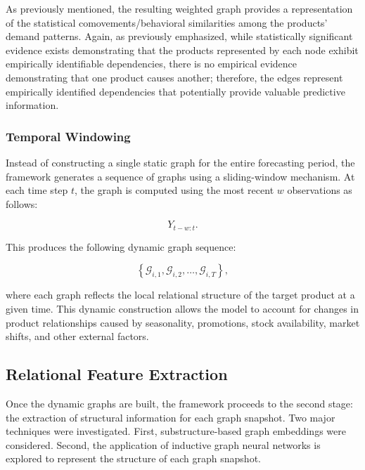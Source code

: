 As previously mentioned, the resulting weighted graph provides a representation of the statistical comovements/behavioral similarities among the products' demand patterns. Again, as previously emphasized, while statistically significant evidence exists demonstrating that the products represented by each node exhibit empirically identifiable dependencies, there is no empirical evidence demonstrating that one product causes another; therefore, the edges represent empirically identified dependencies that potentially provide valuable predictive information.

\subsubsection{Temporal Windowing}
\label{subsubsec:temporal_windowing}

Instead of constructing a single static graph for the entire forecasting period, the framework generates a sequence of graphs using a sliding-window mechanism. At each time step \(t\), the graph is computed using the most recent \(w\) observations as follows:

\begin{equation}
    Y_{t-w:t}.
    \label{eq:sliding_window_graph}
\end{equation}

This produces the following dynamic graph sequence:

\begin{equation}
    \left\{
    \mathcal{G}_{i,1},
    \mathcal{G}_{i,2},
    \dots,
    \mathcal{G}_{i,T}
    \right\},
    \label{eq:dynamic_graph_sequence}
\end{equation}

where each graph reflects the local relational structure of the target product at a given time. This dynamic construction allows the model to account for changes in product relationships caused by seasonality, promotions, stock availability, market shifts, and other external factors.

\subsection{Relational Feature Extraction}

\label{subsec:relational_feature_extraction}

Once the dynamic graphs are built, the framework proceeds to the second stage: the extraction of structural information for each graph snapshot. Two major techniques were investigated. First, substructure-based graph embeddings were considered. Second, the application of inductive graph neural networks is explored to represent the structure of each graph snapshot.

